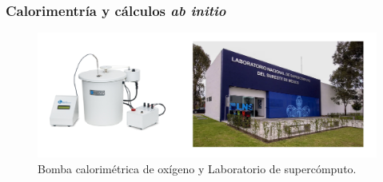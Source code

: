 \documentclass{beamer}
\begin{document}

\begin{frame}[fragile]
\frametitle{Calorimentría y cálculos \textit{ab initio}}

\begin{figure}
\includegraphics[scale=.28]{images/LNS.png}
\caption{Bomba calorimétrica de oxígeno y Laboratorio de supercómputo.}
\end{figure}

\end{frame}
\end{document}
